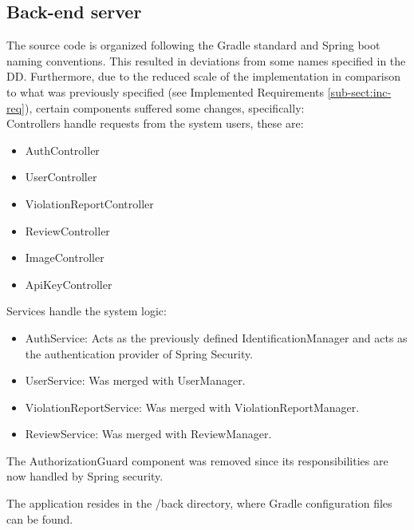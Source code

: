 \subsection{Back-end server}
The source code is organized following the Gradle standard and Spring boot naming conventions. This resulted in deviations from some names specified in the DD. Furthermore, due to the reduced scale of the implementation in comparison to what was previously specified (see Implemented Requirements \ref{sub-sect:inc-req}), certain components suffered some changes, specifically:\\

Controllers handle requests from the system users, these are: 
\begin{itemize}[label={\textbf{-}}, leftmargin=2cm]  \itemsep0em
    \item AuthController
    \item UserController
    \item ViolationReportController
    \item ReviewController
    \item ImageController
    \item ApiKeyController
\end{itemize}

Services handle the system logic:
\begin{itemize}[label={\textbf{-}}, leftmargin=2cm] \itemsep0em
    \item AuthService: Acts as the previously defined IdentificationManager and acts as the authentication provider of Spring Security.
    \item UserService: Was merged with UserManager.
    \item ViolationReportService: Was merged with ViolationReportManager.
    \item ReviewService: Was merged with ReviewManager.
\end{itemize}

The AuthorizationGuard component was removed since its responsibilities are now handled by Spring security.

The application resides in the /back directory, where Gradle configuration files can be found.

